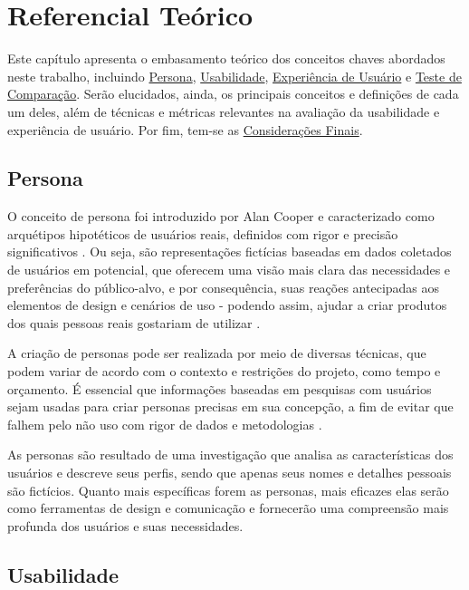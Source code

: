 \chapter[Referencial Teórico]{Referencial Teórico}

Este capítulo apresenta o embasamento teórico dos conceitos chaves abordados
neste trabalho, incluindo \hyperref[sec:Persona]{Persona}, \hyperref[sec:Usabilidade]
{Usabilidade}, \hyperref[sec:Experiência de Usuário]{Experiência de Usuário} e 
\hyperref[sec:Teste de Comparação]{Teste de Comparação}. 
Serão elucidados, ainda, os principais conceitos e definições de cada um deles, além de 
técnicas e métricas relevantes na avaliação da usabilidade e experiência de usuário. Por 
fim, tem-se as \hyperref[sec:Considerações Finais]{Considerações Finais}.

\section{Persona}
\label{sec:Persona}

O conceito de persona foi introduzido por Alan Cooper e caracterizado como 
arquétipos hipotéticos de usuários reais, definidos com rigor e precisão 
significativos \cite{cooper1999}. Ou seja, são representações fictícias 
baseadas em dados coletados de usuários em potencial, que oferecem uma visão 
mais clara das necessidades e preferências do público-alvo, e por consequência, 
suas reações antecipadas aos elementos de design e cenários de uso - podendo 
assim, ajudar a criar produtos dos quais pessoas reais gostariam de utilizar 
\cite{pruitt2006}.

A criação de personas pode ser realizada por meio de diversas técnicas, que 
podem variar de acordo com o contexto e restrições do projeto, como tempo e 
orçamento. É essencial que informações baseadas em pesquisas com usuários sejam 
usadas para criar personas precisas em sua concepção, a fim de evitar que falhem 
pelo não uso com rigor de dados e metodologias \cite{pruitt2006}.

As personas são resultado de uma investigação que analisa as características dos 
usuários e descreve seus perfis, sendo que apenas seus nomes e detalhes pessoais 
são fictícios. Quanto mais específicas forem as personas, mais eficazes elas serão 
como ferramentas de design e comunicação e fornecerão uma compreensão mais profunda 
dos usuários e suas necessidades. \cite{barbosa2010}

\section{Usabilidade}
\label{sec:Usabilidade}

